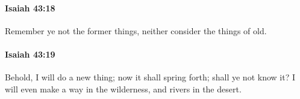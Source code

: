 		\paragraph{Isaiah 43:18} %
			\label{ISAIAH-43-18}

			Remember ye not the former things, neither consider the things of old.


		\paragraph{Isaiah 43:19} %
			\label{ISAIAH-43-19}

			Behold, I will do a new thing; now it shall spring forth; shall ye not know it? I will even make a way in the wilderness, and rivers in the desert.


